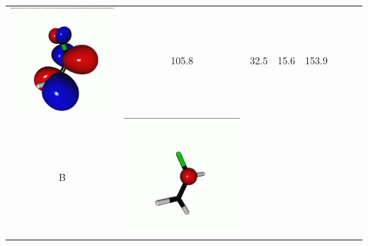 \documentclass[journal=jctcce,manuscript=article]{achemso}
\begin{document}
\begin{table}[H]
\begin{tabular}{ c | c c c | c c c c}
\begin{minipage}{0.2\textwidth}
         \includegraphics[scale=0.10]{NTO/CH2CHF/1p.png}
     \end{minipage}
     & 105.8
     & 32.5
     & 15.6
     & 153.9
     \\
         B &  
     \begin{minipage}{0.2\textwidth}
         \centering
         \includegraphics[scale=0.10]{NTO/CH2CHF/2h.png}

\end{minipage}
\end{tabular}
\end{table}
\end{document}
